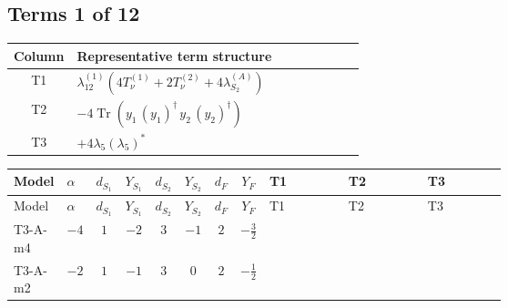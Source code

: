 \documentclass[8pt]{article}
\begin{document}
\begin{landscape}
\subsection*{Terms 1 of 12}
\begin{center}
\begin{tabular}{@{}c >{\raggedright\arraybackslash}p{0.82\linewidth}@{}}
\toprule
Column & Representative term structure \\
\midrule
T1 & \(\displaystyle {\lambda_{12}^{(1)}} (4 T_{\nu}^{(1)}+2 T_{\nu}^{(2)}+4 {\lambda_{S_2}^{(A)}})\) \\
\midrule
T2 & \(\displaystyle -4 \operatorname{Tr}\!\left({y_1}\,\left({y_1}\right)^{\dagger}\,{y_2}\,\left({y_2}\right)^{\dagger}\right)\) \\
\midrule
T3 & \(\displaystyle +4 {\lambda_5} \left({\lambda_5}\right)^{*}\) \\
\midrule
\bottomrule
\end{tabular}
\end{center}
\smallskip
\tiny
\begin{longtable}{@{}llcccccc >{\raggedright\arraybackslash}p{0.21\linewidth} >{\raggedright\arraybackslash}p{0.21\linewidth} >{\raggedright\arraybackslash}p{0.21\linewidth}@{}}
\toprule
Model & $\alpha$ & $d_{S_1}$ & $Y_{S_1}$ & $d_{S_2}$ & $Y_{S_2}$ & $d_F$ & $Y_F$ & T1 & T2 & T3 \\
\midrule
\endfirsthead
\toprule
Model & $\alpha$ & $d_{S_1}$ & $Y_{S_1}$ & $d_{S_2}$ & $Y_{S_2}$ & $d_F$ & $Y_F$ & T1 & T2 & T3 \\
\midrule
\endhead
T3-A-m4 & $-4$ & $1$ & $-2$ & $3$ & $-1$ & $2$ & $-\frac{3}{2}$ & \scriptsize\adjustbox{max width=\linewidth}{$\begin{gathered} {\lambda_{12}^{(1)}} (4 T_{\nu}^{(1)}+2 T_{\nu}^{(2)}+4 {\lambda_{S_2}^{(A)}})\end{gathered}$} & \scriptsize\adjustbox{max width=\linewidth}{$\begin{gathered} -4 \operatorname{Tr}\!\left({y_1}\,\left({y_1}\right)^{\dagger}\,{y_2}\,\left({y_2}\right)^{\dagger}\right)\end{gathered}$} & \scriptsize\adjustbox{max width=\linewidth}{$\begin{gathered} +4 {\lambda_5} \left({\lambda_5}\right)^{*}\end{gathered}$} \\
\midrule
T3-A-m2 & $-2$ & $1$ & $-1$ & $3$ & $0$ & $2$ & $-\frac{1}{2}$ & \scriptsize\adjustbox{max width=\linewidth}{$\begin{gathered} {\lambda_{12}^{(1)}} (4 T_{\nu}^{(1)}+2 T_{\nu}^{(2)}+4 {\lambda_{S_2}^{(A)}})\end{gathered}$} & \scriptsize\adjustbox{max width=\linewidth}{$\begin{gathered} -4 \operatorname{Tr}\!\left({y_1}\,\left({y_1}\right)^{\dagger}\,{y_2}\,\left({y_2}\right)^{\dagger}\right)\end{gathered}$} & \scriptsize\adjustbox{max width=\linewidth}{$\begin{gathered} +4 {\lambda_5} \left({\lambda_5}\right)^{*}\end{gathered}$} \\

\end{longtable}
\end{landscape}
\end{document}
